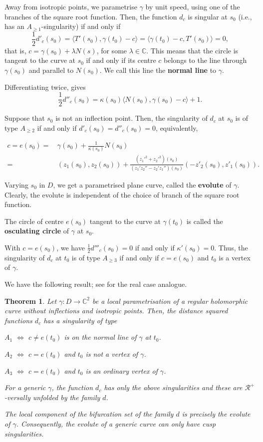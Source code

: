 \documentclass[12pt,a4paper]{article}
\newtheorem{theo}[prop]{Theorem}
\begin{document}
Away from isotropic points, we parametrise 
$\gamma$ by unit speed, using one of the branches of the square root function. 
Then, the function $d_c$ is singular at $s_0$ (i.e., has an $A_{\ge 1}$-singularity) if and only if
$$
\frac12 d'_{c}(s_0)=\langle T'(s_0), {\gamma(t_0)-c}\rangle =\langle \gamma(t_0)-c, {T'(s_0)}\rangle=0,
$$
that is, 
 $c=\gamma(s_0)+\lambda N(s)$, 
for some $\lambda \in \mathbb C$. 
This means that the circle is tangent to the curve at $s_0$ if and only if its centre ${c}$ 
belongs to the line through $\gamma(s_0)$ and parallel to $N(s_0)$.
We call this line the {\bf normal line} to $\gamma$.

Differentiating twice, gives
$$
\frac12 d''_{c}(s_0)=\kappa(s_0)\langle N(s_0), {\gamma(s_0)-c}\rangle +1.
$$

Suppose that $s_0$ is not an inflection point. 
Then, the singularity of $d_c$ at $s_0$ is of type $A_{\ge 2}$ if and only if $d'_c(s_0)=d''_c(s_0)=0$, equivalently, 

\begin{align} \label{eq:evolute}
c=e(s_0)=&\,  \gamma(s_0)+\frac1{\kappa(s_0)}N(s_0) \nonumber \\
=&\,  (z_1(s_0),z_2(s_0))+\frac{(z_1'^2+z_2'^2)(s_0)}{(z_1'z_2''-z_2'z_1'')(s_0)}(-z'_2(s_0),z'_1(s_0)).
\end{align}


Varying $s_0$ in $D$, we get a parametrised plane curve, called the {\bf evolute} of $\gamma$. 
Clearly, the evolute is independent of the choice of branch of the square root function.

The circle of centre $e(s_0)$ tangent to the curve at $\gamma(t_0)$ is called the {\bf osculating circle} of $\gamma$ at $s_0$.

With $c=e(s_0)$, we have $\frac12 d'''_c(s_0)=0$ if and only if $\kappa'(s_0)=0$. Thus, the singularity of 
$d_c$ at $t_0$ is of type $A_{\ge 3}$ if and only if $c=e(s_0)$ and $t_0$ is a vertex of $\gamma$.

We have the following result;  see \cite{BG} for the real case analogue. 

\begin{theo}
Let $\gamma:D\to \mathbb C^2$ be a local parametrisation of a regular holomorphic curve without inflections and isotropic points. Then,
the distance squared functions $d_c$ has a singularity of type

$A_1$ $\iff$ $c\ne e(t_0)$ is on the normal line of $\gamma$ at $t_0$.

$A_2$ $\iff$ $c= e(t_0)$ and $t_0$ is not a vertex of $\gamma$.

$A_3$ $\iff$ $c= e(t_0)$ and $t_0$ is an ordinary vertex of $\gamma$.

For a generic $\gamma$, the function $d_c$ has only the above singularities and these are $\mathcal R^+$-versally unfolded by the family $d$. 

The local component of the bifurcation set of the family $d$ is precisely the evolute of $\gamma$. 
Consequently, the evolute of a generic curve can only have cusp singularities.
\end{theo}
\end{document}
